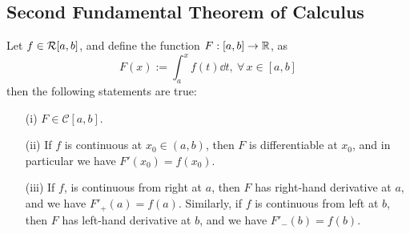 \subsection{Second Fundamental Theorem of Calculus}

\begin{thm}\label{thm2:feb14}
    Let $f \in \mathcal{R}[a,b]$, and define the function $F : [a,b] \to \mathbb{R}$, as 
    \begin{equation}\label{eq2:feb14}
        F(x) := \int_a^x f(t) \dd{t}, \ \forall \, x \in [a,b]
    \end{equation}
    then the following statements are true:
    \begin{enumerate}
        \item[(i)] $F \in \mathcal{C}[a,b]$.
        \item[(ii)] If $f$ is continuous at $x_0 \in (a,b)$, then $F$ is differentiable at $x_0$, and in particular we have $F'(x_0) = f(x_0)$.
        \item[(iii)] If $f$, is continuous from right at $a$, then $F$ has right-hand derivative at $a$, and we have $F'_{+}(a) = f(a)$. Similarly, if $f$ is continuous from left at $b$, then $F$ has left-hand derivative at $b$, and we have $F'_{-}(b) = f(b)$. 
    \end{enumerate}
\end{thm}


